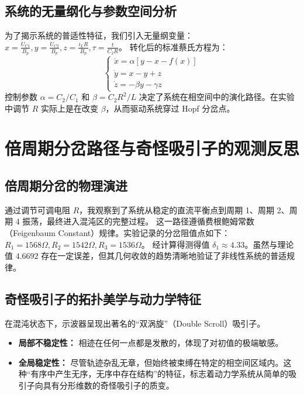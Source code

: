 \documentclass[12pt,a4paper]{article}
\begin{document}
\subsection{系统的无量纲化与参数空间分析}
为了揭示系统的普适性特征，我们引入无量纲变量：
$x = \frac{U_{C1}}{B_p}, y = \frac{U_{C2}}{B_p}, z = \frac{i_L R}{B_p}, \tau = \frac{t}{C_2 R}$。
转化后的标准蔡氏方程为：
\begin{equation}
\begin{cases}
\dot{x} = \alpha [y - x - f(x)] \\
\dot{y} = x - y + z \\
\dot{z} = -\beta y - \gamma z
\end{cases}
\end{equation}
控制参数 $\alpha = C_2/C_1$ 和 $\beta = C_2 R^2/L$ 决定了系统在相空间中的演化路径。在实验中调节 $R$ 实际上是在改变 $\beta$，从而驱动系统穿过 Hopf 分岔点。

\section{倍周期分岔路径与奇怪吸引子的观测反思}

\subsection{倍周期分岔的物理演进}
通过调节可调电阻 $R$，我观察到了系统从稳定的直流平衡点到周期 1、周期 2、周期 4 振荡，最终进入混沌区的完整过程。
这一路径遵循费根鲍姆常数（Feigenbaum Constant）规律。实验记录的分岔阻值点如下：
$R_1 = 1568 \Omega, R_2 = 1542 \Omega, R_3 = 1536 \Omega$。
经计算得测得值 $\delta_1 \approx 4.33$。虽然与理论值 $4.6692$ 存在一定误差，但其几何收敛的趋势清晰地验证了非线性系统的普适规律。



\subsection{奇怪吸引子的拓扑美学与动力学特征}
在混沌状态下，示波器呈现出著名的“双涡旋”（Double Scroll）吸引子。
\begin{itemize}
    \item \textbf{局部不稳定性：} 相迹在任何一点都是发散的，体现了对初值的极端敏感。
    \item \textbf{全局稳定性：} 尽管轨迹杂乱无章，但始终被束缚在特定的相空间区域内。这种“有序中产生无序，无序中存在结构”的特征，标志着动力学系统从简单的吸引子向具有分形维数的奇怪吸引子的质变。
\end{itemize}
\end{document}
